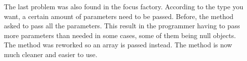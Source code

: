 The last problem was also found in the focus factory. According to the type you want, a certain amount of parameters need to be passed. Before, the method asked to pass all the parameters. This result in the programmer having to pass more parameters than needed in some cases, some of them being null objects. The method was reworked so an array is passed instead. The method is now much cleaner and easier to use.

